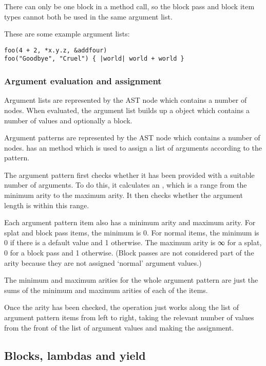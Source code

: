 There can only be one block in a method call, so the block pass and block item types cannot both be used in the same argument list.

These are some example argument lists:

\begin{lstlisting}
foo(4 + 2, *x.y.z, &addfour)
foo("Goodbye", "Cruel") { |world| world + world }
\end{lstlisting}

\subsubsection{Argument evaluation and assignment}

Argument lists are represented by the  AST node which contains a number of \-\- nodes. When evaluated, the argument list builds up a  object which contains a number of values and optionally a block.

Argument patterns are represented by the  AST node which contains a number of \-\- nodes.  has an  method which is used to assign a list of arguments according to the pattern.

The argument pattern first checks whether it has been provided with a suitable number of arguments. To do this, it calculates an , which is a range from the minimum arity to the maximum arity. It then checks whether the argument length is within this range.

Each argument pattern item also has a minimum arity and maximum arity. For splat and block pass items, the minimum is 0. For normal items, the minimum is 0 if there is a default value and 1 otherwise. The maximum arity is ∞ for a splat, 0 for a block pass and 1 otherwise. (Block passes are not considered part of the arity because they are not assigned `normal' argument values.)

The minimum and maximum arities for the whole argument pattern are just the sums of the minimum and maximum arities of each of the items.

Once the arity has been checked, the  operation just works along the list of argument pattern items from left to right, taking the relevant number of values from the front of the list of argument values and making the assignment.

\subsection{Blocks, lambdas and yield}

